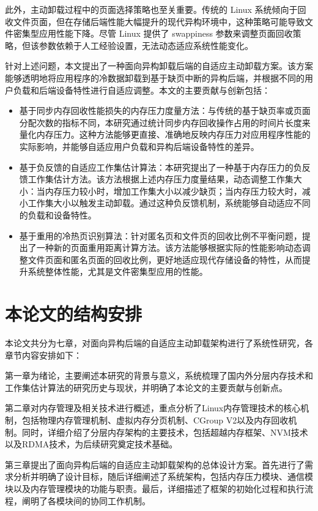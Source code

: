此外，主动卸载过程中的页面选择策略也至关重要。传统的 Linux 系统倾向于回收文件页面，但在存储后端性能大幅提升的现代异构环境中，这种策略可能导致文件密集型应用性能下降。尽管 Linux 提供了 swappiness 参数来调整页面回收策略，但该参数依赖于人工经验设置，无法动态适应系统性能变化。

针对上述问题，本文提出了一种面向异构卸载后端的自适应主动卸载方案。该方案能够透明地将应用程序的冷数据卸载到基于缺页中断的异构后端，并根据不同的用户负载和后端设备特性进行自适应调整。本文的主要贡献与创新包括：

\begin{itemize}
    \item 基于同步内存回收性能损失的内存压力度量方法：与传统的基于缺页率或页面分配次数的指标不同，本研究通过统计同步内存回收操作占用的时间片长度来量化内存压力。这种方法能够更直接、准确地反映内存压力对应用程序性能的实际影响，并能够自适应用户负载和异构后端设备特性的差异。

    \item 基于负反馈的自适应工作集估计算法：本研究提出了一种基于内存压力的负反馈工作集估计方法。该方法根据上述内存压力度量结果，动态调整工作集大小：当内存压力较小时，增加工作集大小以减少缺页；当内存压力较大时，减小工作集大小以触发主动卸载。通过这种负反馈机制，系统能够自动适应不同的负载和设备特性。

    \item 基于重用的冷热页识别算法：针对匿名页和文件页的回收比例不平衡问题，提出了一种新的页面重用距离计算方法。该方法能够根据实际的性能影响动态调整文件页面和匿名页面的回收比例，更好地适应现代存储设备的特性，从而提升系统整体性能，尤其是文件密集型应用的性能。
\end{itemize}

\section{本论文的结构安排}

本论文共分为七章，对面向异构后端的自适应主动卸载架构进行了系统性研究，各章节内容安排如下：

第一章为绪论，主要阐述本研究的背景与意义，系统梳理了国内外分层内存技术和工作集估计算法的研究历史与现状，并明确了本论文的主要贡献与创新点。

第二章对内存管理及相关技术进行概述，重点分析了Linux内存管理技术的核心机制，包括物理内存管理机制、虚拟内存分页机制、CGroup V2以及内存回收机制。同时，详细介绍了分层内存架构的主要技术，包括超越内存框架、NVM技术以及RDMA技术，为后续研究奠定技术基础。

第三章提出了面向异构后端的自适应主动卸载架构的总体设计方案。首先进行了需求分析并明确了设计目标，随后详细阐述了系统架构，包括内存压力模块、通信模块以及内存管理模块的功能与职责。最后，详细描述了框架的初始化过程和执行流程，阐明了各模块间的协同工作机制。

